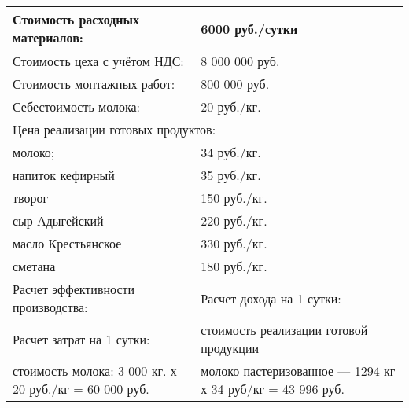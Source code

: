 \begin{table}[]
\begin{tabularx}{\textwidth}{|p{8.05cm}|p{8.05cm}|}
		Стоимость расходных материалов:                                         & 6000 руб./сутки                                                     \\ \hline
		Стоимость цеха с учётом НДС:                                            & 8 000 000 руб.                                                      \\ \hline
		Стоимость монтажных работ:                                              & 800 000 руб.                                                        \\ \hline
		Себестоимость молока:                                                   & 20 руб./кг.                                                         \\ \hline
		\multicolumn{2}{|l|}{Цена реализации готовых продуктов:}                                                                                      \\ \hline
		молоко;                                                                 & 34 руб./кг.                                                         \\ \hline
		напиток кефирный                                                        & 35 руб./кг.                                                         \\ \hline
		творог                                                                  & 150 руб./кг.                                                        \\ \hline
		сыр Адыгейский                                                          & 220 руб./кг.                                                        \\ \hline
		масло Крестьянское                                                      & 330 руб./кг.                                                        \\ \hline
		сметана                                                                 & 180 руб./кг.                                                        \\ \hline
		Расчет эффективности производства:                                      & Расчет дохода на 1 сутки:                                           \\ \hline
		Расчет затрат на 1 сутки:                                               & стоимость реализации готовой продукции                              \\ \hline
		стоимость молока: 3 000 кг. х 20 руб./кг =  60 000 руб.                 & молоко пастеризованное — 1294 кг х 34 руб/кг = 43 996 руб.          \\ \hline

\end{tabularx}
\end{table}
